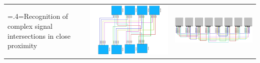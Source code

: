 \begin{table}[H]
\begin{tabularx}{\textwidth}{@{}>{\hsize=.4\hsize\linewidth=\hsize}X m{} m{}@{}}
        \midrule
        Recognition of complex signal intersections in close proximity &  
        \includegraphics[width=\linewidth]{pictures/many_intersections.png} & 
        \includegraphics[width=\linewidth]{pictures/many_intersections_hardware.png} \\


\end{tabularx}
\end{table}
